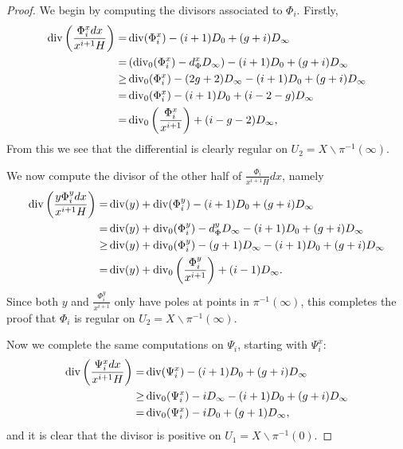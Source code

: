 \begin{proof}
We begin by computing the divisors associated to $\Phi_i$.
Firstly,
\begin{align*}
\operatorname{div} \left( \frac{\Phi_i^x dx}{x^{i+1} H} \right)  = &  \operatorname{div}(\Phi_i^x) -(i+1)D_0 + (g+i)D_\infty\\
 = & \left( \operatorname{div}_0(\Phi_i^x) -d_\Phi^xD_\infty\right) -(i+1)D_0 + (g+i)D_\infty\\
 \geq & \operatorname{div}_0(\Phi_i^x) - (2g+2)D_\infty - (i+1)D_0 + (g+i)D_\infty \\
 = &  \operatorname{div}_0(\Phi_i^x) - (i+1)D_0 + (i-2-g)D_\infty \\
 =  & \operatorname{div}_0 \left( \frac{\Phi_i^x}{x^{i+1}} \right) + (i-g-2)D_\infty,
\end{align*}
From this we see that the differential is clearly regular on $U_2 = X \backslash \pi^{-1}(\infty)$.

We now compute the divisor of the other half of $\frac{\Phi_i}{x^{i+1}H}dx$, namely
\begin{align*}
\operatorname{div}\left(\frac{y\Phi_i^y dx}{x^{i+1}H} \right)  = & \operatorname{div}(y) + \operatorname{div}(\Phi_i^y) -(i+1)D_0 + (g+i)D_\infty\\
 = & \operatorname{div}(y) + \operatorname{div}_0(\Phi_i^y) - d_\Phi^yD_\infty -(i+1)D_0 + (g+i)D_\infty \\
 \geq & \operatorname{div}(y) + \operatorname{div}_0(\Phi_i^y) - (g+1)D_\infty - (i+1)D_0 + (g+i)D_\infty \\
 = & \operatorname{div}(y) + \operatorname{div}_0\left(\frac{\Phi_i^y}{x^{i+1}} \right) + (i-1)D_\infty.
\end{align*}
Since both $y$ and $\frac{\Phi_i^y}{x^{i+1}}$ only have poles at points in $\pi^{-1}(\infty)$, this completes the proof that $\Phi_i$ is regular on $U_2 = X \backslash \pi^{-1}(\infty)$.

Now we complete the same computations on $\Psi_i$, starting with $\Psi_i^x$:
\begin{align*}
\operatorname{div}\left( \frac{\Psi_i^x dx}{x^{i+1}H} \right)  = &  \operatorname{div}(\Psi_i^x)  - (i+1)D_0 + (g+i)D_\infty \\
 \geq &  \operatorname{div}_0(\Psi_i^x ) - iD_\infty - (i+1)D_0 + (g+i)D_\infty \\
 = &  \operatorname{div}_0(\Psi_i^x) - iD_0 + (g+1)D_\infty,
\end{align*}
and it is clear that the divisor is positive on $U_1 = X \backslash \pi^{-1}(0)$.


\end{proof}

